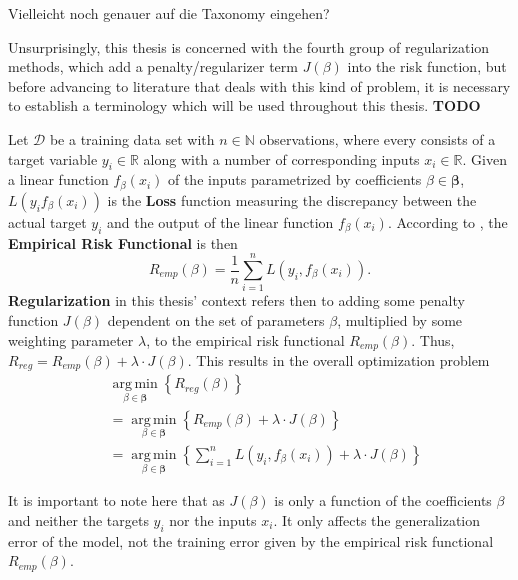 \documentclass[12pt,a4paper]{article}
\newenvironment{lightbluebox}{%
    \begin{tcolorbox}[colback=lightblue, colframe=lightblue, fontupper=\itshape]%
}{%
    \end{tcolorbox}%
}
\DeclareMathOperator*{\argmin}{arg\,min}
\begin{document}
\begin{lightbluebox}
Vielleicht noch genauer auf die Taxonomy eingehen? 
\end{lightbluebox} 

Unsurprisingly, this thesis is concerned with the fourth group of regularization methods, which add a penalty/regularizer term $J(\beta)$ into the risk function, but before advancing to literature that deals with this kind of problem, it is necessary to establish a terminology which will be used throughout this thesis. \textbf{TODO}

Let $\mathcal{D}$ be a training data set with $n \in \mathbb{N}$ observations, where every  consists of a target variable $y_i \in \mathbb{R}$ along with a number of corresponding inputs $x_i \in \mathbb{R}$. Given a linear function $f_\beta(x_i)$ of the inputs parametrized by coefficients $\beta \in \boldsymbol{\beta}$, $L(y_i f_\beta(x_i))$ is the \textbf{Loss} function measuring the discrepancy between the actual target $y_i$ and the output of the linear function $f_\beta(x_i)$. According to \textcite{Vapnik1991}, the \textbf{Empirical Risk Functional} is then 
\[
R_{emp}(\beta) = \frac{1}{n} \sum_{i=1}^n L(y_i, f_\beta(x_i)).
\]
\textbf{Regularization} in this thesis' context refers then to adding some penalty function $J(\beta)$ dependent on the set of parameters $\beta$, multiplied by some weighting parameter $\lambda$, to the empirical risk functional $R_{emp}(\beta)$. Thus, $R_{reg} = R_{emp}(\beta) + \lambda\cdot J(\beta)$. This results in the overall optimization problem
\begin{align*}
&\underset{\beta \in \boldsymbol{\beta}}{\argmin}\left\{R_{reg}(\beta)\right\}\\
&=\underset{\beta \in \boldsymbol{\beta}}{\argmin}\left\{R_{emp}(\beta) + \lambda\cdot J(\beta)\right\}\\
&=\underset{\beta \in \boldsymbol{\beta}}{\argmin}\left\{\sum_{i=1}^n L(y_i, f_\beta(x_i)) + \lambda\cdot J(\beta)\right\}
\end{align*}

It is important to note here that as $J(\beta)$ is only a function of the coefficients $\beta$ and neither the targets $y_i$ nor the inputs $x_i$. It only affects the generalization error of the model, not the training error given by the empirical risk functional $R_{emp}(\beta)$.
\end{document}
